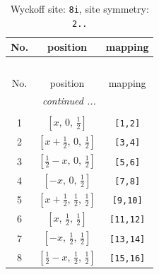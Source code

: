 \documentclass[fleqn,8pt]{jsarticle}
\begin{document}
\renewcommand{\arraystretch}{1.2}
\begin{longtable}{ccc}
\caption{Wyckoff site: {\tt 8i}, site symmetry: {\tt 2..}}
 \\
 \hline \hline
No. & position & mapping \\ \hline \endfirsthead

\multicolumn{2}{l}{\tablename\ \thetable{}} \\
 \hline \hline
No. & position & mapping \\ \hline \endhead

 \hline \hline
\multicolumn{2}{r}{\footnotesize\it continued ...} \\ \endfoot

 \hline \hline
\multicolumn{2}{r}{} \\ \endlastfoot

1 & $\left[ x,\, 0,\, \frac{1}{2} \right]$ & {\tt [1,2]} \\ \hline
2 & $\left[ x + \frac{1}{2},\, 0,\, \frac{1}{2} \right]$ & {\tt [3,4]} \\ \hline
3 & $\left[ \frac{1}{2} - x,\, 0,\, \frac{1}{2} \right]$ & {\tt [5,6]} \\ \hline
4 & $\left[ - x,\, 0,\, \frac{1}{2} \right]$ & {\tt [7,8]} \\ \hline
5 & $\left[ x + \frac{1}{2},\, \frac{1}{2},\, \frac{1}{2} \right]$ & {\tt [9,10]} \\ \hline
6 & $\left[ x,\, \frac{1}{2},\, \frac{1}{2} \right]$ & {\tt [11,12]} \\ \hline
7 & $\left[ - x,\, \frac{1}{2},\, \frac{1}{2} \right]$ & {\tt [13,14]} \\ \hline
8 & $\left[ \frac{1}{2} - x,\, \frac{1}{2},\, \frac{1}{2} \right]$ & {\tt [15,16]} \\
\end{longtable}
\renewcommand{\arraystretch}{1.2}
\end{document}
